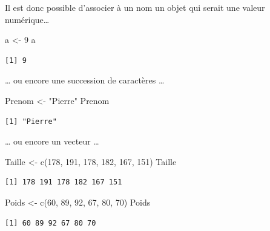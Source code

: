 \documentclass[
  letterpaper,
]{book}
\newenvironment{Shaded}{\begin{snugshade}}{\end{snugshade}}
\newcommand{\DecValTok}[1]{\textcolor[rgb]{0.68,0.00,0.00}{#1}}
\newcommand{\FunctionTok}[1]{\textcolor[rgb]{0.28,0.35,0.67}{#1}}
\newcommand{\NormalTok}[1]{\textcolor[rgb]{0.00,0.23,0.31}{#1}}
\newcommand{\OtherTok}[1]{\textcolor[rgb]{0.00,0.23,0.31}{#1}}
\newcommand{\StringTok}[1]{\textcolor[rgb]{0.13,0.47,0.30}{#1}}
\begin{document}
Il est donc possible d'associer à un nom un objet qui serait une valeur
numérique\ldots{}

\begin{Shaded}
\begin{Highlighting}[]
\NormalTok{a }\OtherTok{\textless{}{-}} \DecValTok{9}
\NormalTok{a}
\end{Highlighting}
\end{Shaded}

\begin{verbatim}
[1] 9
\end{verbatim}

\ldots{} ou encore une succession de caractères \ldots{}

\begin{Shaded}
\begin{Highlighting}[]
\NormalTok{Prenom }\OtherTok{\textless{}{-}} \StringTok{"Pierre"}
\NormalTok{Prenom}
\end{Highlighting}
\end{Shaded}

\begin{verbatim}
[1] "Pierre"
\end{verbatim}

\ldots{} ou encore un vecteur \ldots{}

\begin{Shaded}
\begin{Highlighting}[]
\NormalTok{Taille }\OtherTok{\textless{}{-}} \FunctionTok{c}\NormalTok{(}\DecValTok{178}\NormalTok{, }\DecValTok{191}\NormalTok{, }\DecValTok{178}\NormalTok{, }\DecValTok{182}\NormalTok{, }\DecValTok{167}\NormalTok{, }\DecValTok{151}\NormalTok{)}
\NormalTok{Taille}
\end{Highlighting}
\end{Shaded}

\begin{verbatim}
[1] 178 191 178 182 167 151
\end{verbatim}

\begin{Shaded}
\begin{Highlighting}[]
\NormalTok{Poids }\OtherTok{\textless{}{-}} \FunctionTok{c}\NormalTok{(}\DecValTok{60}\NormalTok{, }\DecValTok{89}\NormalTok{, }\DecValTok{92}\NormalTok{, }\DecValTok{67}\NormalTok{, }\DecValTok{80}\NormalTok{, }\DecValTok{70}\NormalTok{)}
\NormalTok{Poids}
\end{Highlighting}
\end{Shaded}

\begin{verbatim}
[1] 60 89 92 67 80 70
\end{verbatim}
\end{document}
